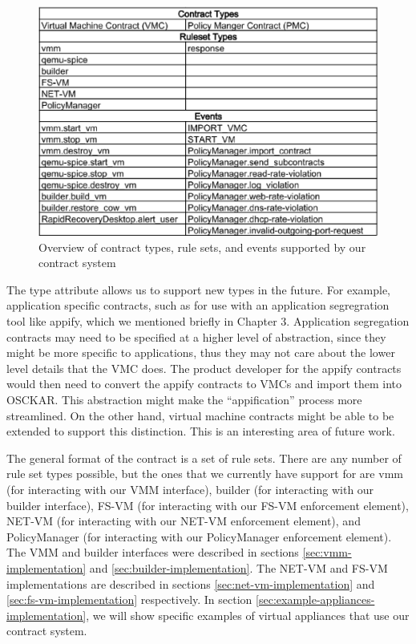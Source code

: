 \begin{figure}[tbp]
\begin{centering}
\caption{Overview of contract types, rule sets, and events supported by our contract system}
\label{fig:ContractsSummary}
\includegraphics[scale=0.8]{figs/ContractsSummary}
\end{centering}
\end{figure}


The type attribute allows us to support new types in the future. For example, application specific contracts, such as for use with an application segregration tool like appify, which we mentioned briefly in Chapter 3. Application segregation contracts may need to be specified at a higher level of abstraction, since they might be more specific to applications, thus they may not care about the lower level details that the VMC does. The product developer for the appify contracts would then need to convert the appify contracts to VMCs and import them into OSCKAR. This abstraction might make the ``appification'' process more streamlined. On the other hand, virtual machine contracts might be able to be extended to support this distinction. This is an interesting area of future work.

The general format of the contract is a set of rule sets. There are any number of rule set types possible, but the ones that we currently have support for are vmm (for interacting with our VMM interface), builder (for interacting with our builder interface), FS-VM (for interacting with our FS-VM enforcement element), NET-VM (for interacting with our NET-VM enforcement element), and PolicyManager (for interacting with our PolicyManager enforcement element). The VMM and builder interfaces were described in sections \ref{sec:vmm-implementation} and \ref{sec:builder-implementation}. The NET-VM and FS-VM implementations are described in sections \ref{sec:net-vm-implementation} and \ref{sec:fs-vm-implementation} respectively. In section \ref{sec:example-appliances-implementation}, we will show specific examples of virtual appliances that use our contract system.

